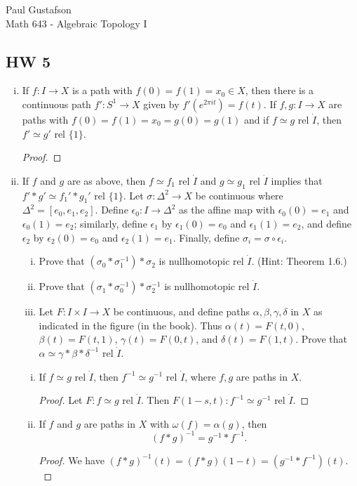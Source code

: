 \documentclass{article}
\begin{document}
\noindent Paul Gustafson\\
\noindent Math 643 - Algebraic Topology I

\subsection*{HW 5}
 \begin{enumerate}[(i)]
\item If $f: I \to X$ is a path with $f(0) = f(1) = x_0 \in X$, then there is a continuous path
$f': S^1 \to X$ given by $f'(e^{2\pi i t}) = f(t)$. If $f, g : I \to X$ are paths with $f(0) = 
f(1) = x_0 = g(0) = g(1)$ and if $f \simeq g$ rel $\dot I$, then $f' \simeq g'$ rel $\{1\}$.

\begin{proof}









\end{proof}

\item If $f$ and $g$ are as above, then $f \simeq f_1$ rel $\dot I$ and $g \simeq g_1$ rel $\dot I$ 
implies that $f' * g' \simeq f_1' * g_1'$ rel $\{1\}$.
 Let $\sigma: \Delta^2 \to X$ be continuous where $\Delta^2 = [e_0, e_1, e_2]$.
Define $\epsilon_0 : I \to \Delta^2$ as the affine map with $\epsilon_0(0) = e_1$ and
$\epsilon_0(1) = e_2$; similarly, define $\epsilon_1$ by $\epsilon_1(0) = e_0$ and $\epsilon_1(1) = e_2$,
and define $\epsilon_2$ by $\epsilon_2(0) = e_0$ and $\epsilon_2(1) = e_1$.
Finally, define $\sigma_i = \sigma \circ \epsilon_i$.
\begin{enumerate}[(i)]
\item Prove that $(\sigma_0 * \sigma_1^{-1})  * \sigma_2$ is nullhomotopic rel $\dot I$. (Hint: Theorem 1.6.)
\item Prove that $(\sigma_1 * \sigma_0^{-1}) * \sigma_2^{-1}$ is nullhomotopic rel $\dot I$.
\item Let $F: I \times I \to X$ be continuous, and define paths $\alpha, \beta, \gamma, \delta$ in $X$ as 
indicated in the figure (in the book). Thus $\alpha(t) = F(t,0)$, $\beta(t) = F(t,1)$, $\gamma(t) = F(0,t)$,
and $\delta(t) = F(1,t)$. Prove that $\alpha \simeq \gamma * \beta * \delta^{-1}$ rel $\dot I$.
\end{enumerate}
 \begin{enumerate}[(i)]
\item If $f \simeq g$ rel $\dot I$, then $f^{-1} \simeq g^{-1}$ rel $\dot I$, where $f,g$ are paths in $X$.
\begin{proof}
Let $F:f \simeq g$ rel $\dot I$. Then $F(1-s, t):f^{-1} \simeq g^{-1}$ rel $\dot I$.
\end{proof}
\item If $f$ and $g$ are paths in $X$ with $\omega(f) = \alpha(g)$, then 
$$(f*g)^{-1} = g^{-1} * f^{-1}.$$
\begin{proof}
We have $(f*g)^{-1}(t) = (f*g)(1-t) = (g^{-1} * f^{-1})(t).$
\end{proof}


\end{enumerate}
\end{enumerate}
\end{document}
